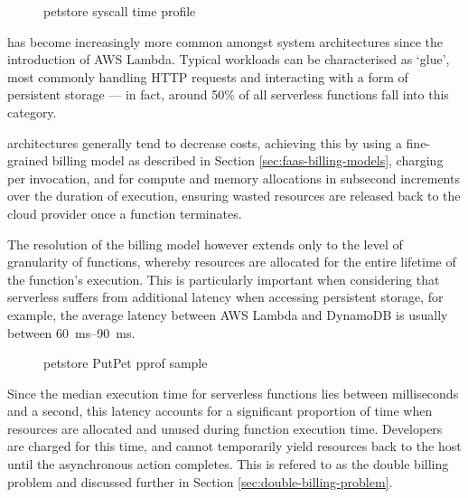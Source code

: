 \begin{figure}
    \begin{center}
        
    \end{center}
    \caption{\faas{} petstore syscall time profile}
\end{figure}

\faaslong{} has become increasingly more common amongst system architectures since the introduction of AWS Lambda\cite{amazonAWSLambda2024}. Typical \faas{} workloads can be characterised as `glue', most commonly handling HTTP requests and interacting with a form of persistent storage --- in fact, around 50\% of all serverless functions fall into this category\cite{eismannReviewServerlessUse2020}.

\faas{} architectures generally tend to decrease costs, achieving this by using a fine-grained billing model as described in Section \ref{sec:faas-billing-models}, charging per invocation, and for compute and memory allocations in subsecond increments over the duration of execution, ensuring wasted resources are released back to the cloud provider once a function terminates.

The resolution of the billing model however extends only to the level of granularity of functions, whereby resources are allocated for the entire lifetime of the function's execution. This is particularly important when considering that serverless suffers from additional latency when accessing persistent storage, for example, the average latency between AWS Lambda and DynamoDB is usually between \qtyrange{60}{90}{\ms}\cite{ghoshCachingTechniquesImprove2020}.

\begin{figure*}
    \begin{center}
        \begin{tikzpicture}[scale = 0.75, every node/.style={scale=0.75}]
            
        \end{tikzpicture}
    \end{center}
    \caption{\faas{} petstore PutPet pprof sample}
\end{figure*}

Since the median execution time for serverless functions lies between milliseconds and a second\cite{eismannReviewServerlessUse2020}, this latency accounts for a significant proportion of time when resources are allocated and unused during function execution time. Developers are charged for this time, and cannot temporarily yield resources back to the host until the asynchronous action completes. This is refered to as the double billing problem\cite{baldiniServerlessTrilemmaFunction2017,yuCharacterizingServerlessPlatforms2020} and discussed further in Section \ref{sec:double-billing-problem}.

